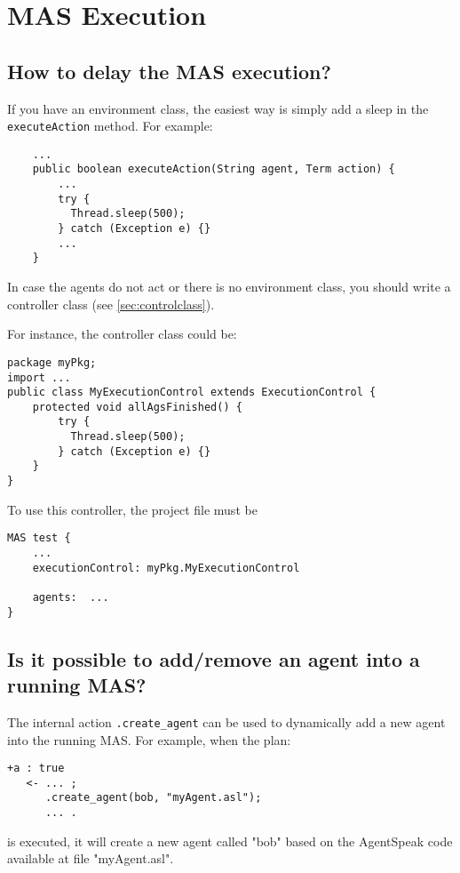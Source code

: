 \documentclass{article}
\newcommand{\code}[1]{\texttt{#1}}
\begin{document}
\section{MAS Execution}

\subsection{How to delay the MAS execution?}

If you have an environment class, the easiest way is simply add a
sleep in the \code{executeAction} method. For example:
\begin{verbatim}
    ...
    public boolean executeAction(String agent, Term action) {
        ...
        try { 
          Thread.sleep(500); 
        } catch (Exception e) {}
        ...
    }
\end{verbatim}

In case the agents do not act or there is no environment class, you
should write a controller class (see \ref{sec:controlclass}). 

For instance, the controller class could be:
\begin{verbatim}
package myPkg;
import ...
public class MyExecutionControl extends ExecutionControl {
    protected void allAgsFinished() {
        try { 
          Thread.sleep(500); 
        } catch (Exception e) {}
    }
}
\end{verbatim}

To use this controller, the project file must be
\begin{verbatim}
MAS test {
    ...
    executionControl: myPkg.MyExecutionControl

    agents:  ...
}
\end{verbatim}

\subsection{Is it possible to add/remove an agent into a running MAS?}

The internal action \code{.create_agent} can be used to dynamically
add a new agent into the running MAS. For example, when the plan:
\begin{verbatim}
+a : true 
   <- ... ; 
      .create_agent(bob, "myAgent.asl");
      ... .
\end{verbatim}
is executed, it will create a new agent called "bob" based on the
AgentSpeak code available at file "myAgent.asl".
\end{document}
